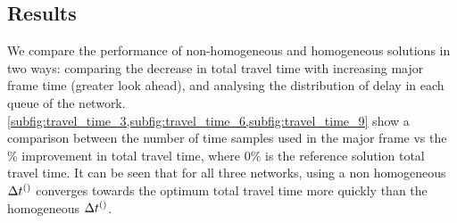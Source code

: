 
\subsection{Results}

We compare the performance of non-homogeneous and homogeneous 
solutions in two ways: comparing the decrease in total travel time with 
increasing major frame time (greater look ahead), and analysing the 
distribution of delay in each queue of the network. 
\cref{subfig:travel_time_3,subfig:travel_time_6,subfig:travel_time_9} show a 
comparison between the number of time samples used in the major 
frame vs the \% improvement in total travel time, where 0\% is the reference solution total travel time. It can be seen that for all three
networks, using a non homogeneous $\DT[]$ converges towards the optimum 
total travel time more quickly than the 
homogeneous $\DT[]$. 

